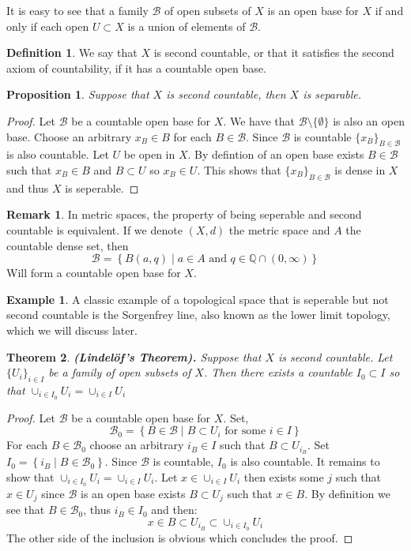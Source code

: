 \documentclass[11pt,a4paper]{article}
\theoremstyle{definition}
\newtheorem{definition}{Definition}[section]
\newtheorem{remark}{Remark}[section]
\newtheorem{example}{Example}[section]
\theoremstyle{plain}
\newtheorem{theorem}{Theorem}[section]
\newtheorem{proposition}[theorem]{Proposition}
\newcommand{\Q}{\mathbb{Q}}
\newcommand{\set}[2]{ \left\{ #1 \mid #2 \right\} }
\renewcommand{\tt}[1]{\textnormal{\textbf{(#1).}}} %
\begin{document}
	It is easy to see that a family $\mathcal{B}$ of open subsets of $X$ is an 
	open base for $X$ if and only if each open $U \subset X$ is a union of 
	elements of $\mathcal{B}$.
	\begin{definition}
		We say that $X$ is second countable, or that it satisfies the second
		axiom of countability, if it has a countable open base.
	\end{definition}
	\begin{proposition}
		Suppose that $X$ is second countable, then $X$ is separable.
	\end{proposition}
	\begin{proof}
		Let $\mathcal{B}$ be a countable open base for $X$. We have that 
		$\mathcal{B} \setminus \{\emptyset\}$ is also an open base. Choose
		an arbitrary $x_B \in B$ for each $B \in \mathcal{B}$. Since 
		$\mathcal{B}$ is countable $\{x_B\}_{B \in \mathcal{B}}$ is also 
		countable. Let $U$ be open in $X$. By defintion of an open base exists 
		$B \in \mathcal{B}$ such that $x_B \in B$ and $B \subset U$ so 
		$x_B \in U$. This shows that $\{x_B\}_{B \in \mathcal{B}}$ is dense
		in $X$ and thus $X$ is seperable.
	\end{proof}
	\begin{remark}
		In metric spaces, the property of being seperable and second countable
		is equivalent. If we denote $(X,d)$ the metric space and $A$ the 
		countable dense set, then
		\[
			\mathcal{B} = \set{B(a,q)}{a \in A \text{ and } q \in \Q \cap 
			(0,\infty)}
		\]
		Will form a countable open base for $X$.
	\end{remark}
	\begin{example}
		A classic example of a topological space that is seperable but not
		second countable is the Sorgenfrey line, also known as the lower
		limit topology, which we will discuss later.
	\end{example}
	\begin{theorem}
		\tt{Lindelöf’s Theorem} Suppose that $X$ is second countable. Let
		$\{U_i\}_{i \in I}$ be a family of open subsets of $X$. Then there
		exists a countable $I_0 \subset I$ so that 
		$\cup_{i \in I_{0}}{U_i} = \cup_{i \in I}{U_i}$
	\end{theorem}
	\begin{proof}
		Let $\mathcal{B}$ be a countable open base for $X$. Set,
		\[
			\mathcal{B}_0 = \set{B \in \mathcal{B}}{B \subset U_i
			\text{ for some } i \in I}
		\]
		For each $B \in \mathcal{B}_0$ choose an arbitrary $i_B \in I$ such
		that $B \subset U_{i_B}$. Set $I_0 = \set{i_B}{B \in \mathcal{B}_0}$.
		Since $\mathcal{B}$ is countable, $I_0$ is also countable. It remains
		to show that $\cup_{i \in I_{0}}{U_i} = \cup_{i \in I}{U_i}$. Let
		$x \in \cup_{i \in I}{U_i}$ then exists some $j$ such that $x \in U_j$
		since $\mathcal{B}$ is an open base exists $B \subset U_j$ such that
		$x \in B$. By definition we see that $B \in \mathcal{B}_0$, thus
		$i_B \in I_0$ and then:
		\[
			x \in B \subset U_{i_B} \subset \cup_{i \in I_{0}}{U_i}
		\]
		The other side of the inclusion is obvious which concludes the proof.
	\end{proof}
\end{document}
